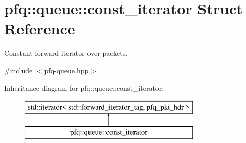 \hypertarget{structpfq_1_1queue_1_1const__iterator}{\section{pfq\+:\+:queue\+:\+:const\+\_\+iterator Struct Reference}
\label{structpfq_1_1queue_1_1const__iterator}
}


Constant forward iterator over packets.  




{\ttfamily \#include $<$pfq-\/queue.\+hpp$>$}

Inheritance diagram for pfq\+:\+:queue\+:\+:const\+\_\+iterator\+:\begin{figure}[H]
\begin{center}
\leavevmode
\includegraphics[height=2.000000cm]{structpfq_1_1queue_1_1const__iterator}
\end{center}
\end{figure}
